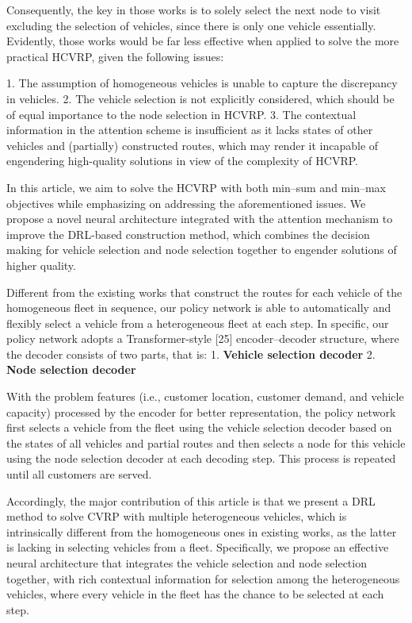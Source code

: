 \documentclass{article}
\begin{document}
	Consequently, the key in those works is to solely select the next node to visit excluding the selection of vehicles, since there is only one vehicle essentially. Evidently, those works would be far less effective when applied to solve the more practical HCVRP, given the following issues:
	
	1. The assumption of homogeneous vehicles is unable to capture the discrepancy in vehicles.
	2. The vehicle selection is not explicitly considered, which should be of equal importance to the node selection in HCVRP.
	3. The contextual information in the attention scheme is insufficient as it lacks states of other vehicles and (partially) constructed routes, which may render it incapable of engendering high-quality solutions in view of the complexity of HCVRP.
	
	In this article, we aim to solve the HCVRP with both min–sum and min–max objectives while emphasizing on addressing the aforementioned issues. We propose a novel neural architecture integrated with the attention mechanism to improve the DRL-based construction method, which combines the decision making for vehicle selection and node selection together to engender solutions of higher quality.
	
	Different from the existing works that construct the routes for each vehicle of the homogeneous fleet in sequence, our policy network is able to automatically and flexibly select a vehicle from a heterogeneous fleet at each step. In specific, our policy network adopts a Transformer-style [25] encoder–decoder structure, where the decoder consists of two parts, that is:
	1. \textbf{Vehicle selection decoder}
	2. \textbf{Node selection decoder}
	
	With the problem features (i.e., customer location, customer demand, and vehicle capacity) processed by the encoder for better representation, the policy network first selects a vehicle from the fleet using the vehicle selection decoder based on the states of all vehicles and partial routes and then selects a node for this vehicle using the node selection decoder at each decoding step. This process is repeated until all customers are served.
	
	Accordingly, the major contribution of this article is that we present a DRL method to solve CVRP with multiple heterogeneous vehicles, which is intrinsically different from the homogeneous ones in existing works, as the latter is lacking in selecting vehicles from a fleet. Specifically, we propose an effective neural architecture that integrates the vehicle selection and node selection together, with rich contextual information for selection among the heterogeneous vehicles, where every vehicle in the fleet has the chance to be selected at each step.
	
\end{document}
